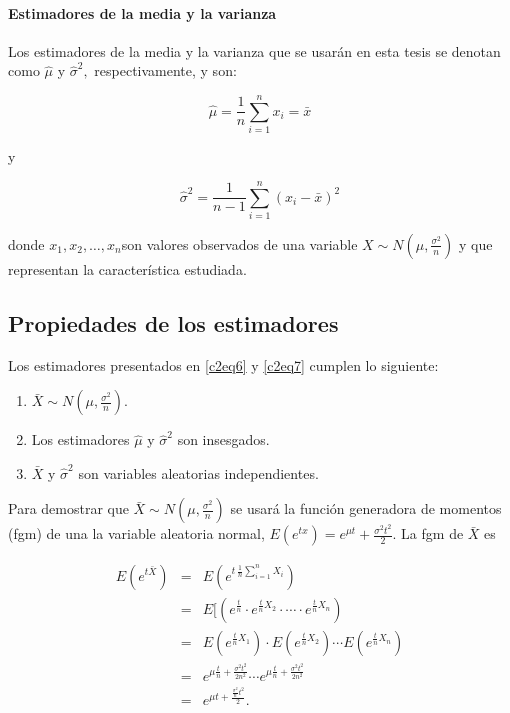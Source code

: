 \documentclass[spanish]{report}
\begin{document}
\paragraph{Estimadores de la media y la varianza}

Los estimadores de la media y la varianza que se usarán en esta tesis
se denotan como $\hat{\mu}$ y $\hat{\sigma}^{2},$ respectivamente,
y son:

\begin{equation}
\hat{\mu}=\frac{1}{n}\sum_{i=1}^{n}x_{i}=\bar{x} 
\label{c2eq6}
\end{equation}


y

\begin{equation}
\hat{\sigma}^{2}=\frac{1}{n-1}\sum_{i=1}^{n}(x_{i}-\bar{x})^{2}
\label{c2eq7}
\end{equation}


donde $x_{1},x_{2},\dots,x_{n}$son valores observados de una variable
$X\sim N(\mu,\frac{\sigma^{2}}{n})$ y que representan la característica
estudiada.


\subsection{Propiedades de los estimadores}

Los estimadores presentados en \ref{c2eq6} y \ref{c2eq7} cumplen
lo siguiente:

\begin{enumerate}
\item $\bar{X}\sim N(\mu,\frac{\sigma^{2}}{n}).$
\item Los estimadores $\hat{\mu}$ y $\hat{\sigma}^{2}$ son insesgados.
\item $\bar{X}$ y $\hat{\sigma}^{2}$ son variables aleatorias independientes.
\end{enumerate}

Para demostrar que $\bar{X}\sim N(\mu,\frac{\sigma^{2}}{n})$ se usará
la función generadora de momentos (fgm) de una la variable aleatoria
normal, $E(e^{tx})=e^{\mu t}+\frac{\sigma^{2}t^{2}}{2}$. La fgm de
$\bar{X}$ es

\begin{eqnarray*}
E(e^{t\bar{X}}) & = & E(e^{t\,\frac{1}{n}\sum_{i=1}^{n}X_{i}})\\
 & = & E[(e^{\frac{t}n}\cdot e^{\frac{t}{n}X_{2}}\cdot\cdots\cdot e^{\frac{t}{n}X_{n}})\\
 & = & E(e^{\frac{t}{n}X_{1}})\cdot E(e^{\frac{t}{n}X_{2}})\cdots E(e^{\frac{t}{n}X_{n}})\\
 & = & e^{\mu\frac{t}{n}+\frac{\sigma^{2}t^{2}}{2n^{2}}}\cdots e^{\mu\frac{t}{n}+\frac{\sigma^{2}t^{2}}{2n^{2}}}\\
 & = & e^{\mu t+\frac{\frac{\sigma^{2}}{n}t^{2}}{2}}.
\end{eqnarray*}
\end{document}
